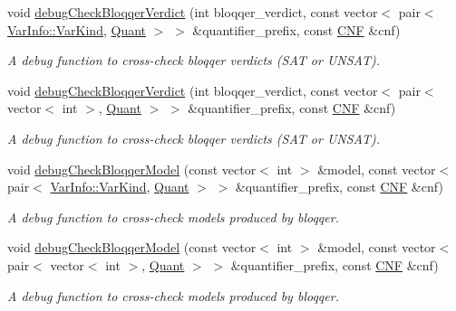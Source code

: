 \begin{DoxyCompactItemize}
void \hyperlink{classDepQBFApi_a3a24cd04a3ddc626f2933429dda4e3b9}{debug\-Check\-Bloqqer\-Verdict} (int bloqqer\-\_\-verdict, const vector$<$ pair$<$ \hyperlink{classVarInfo_a64d1da76cf84fe674e5fef9764ef11cf}{Var\-Info\-::\-Var\-Kind}, \hyperlink{classQBFSolver_ac091e263cb55286cc07b2451bcf4d3c7}{Quant} $>$ $>$ \&quantifier\-\_\-prefix, const \hyperlink{classCNF}{C\-N\-F} \&cnf)
\begin{DoxyCompactList}\small\item\em A debug function to cross-\/check bloqqer verdicts (S\-A\-T or U\-N\-S\-A\-T). \end{DoxyCompactList}\item 
void \hyperlink{classDepQBFApi_afe717cb04d4bd6223bca3e52ba2c7e1f}{debug\-Check\-Bloqqer\-Verdict} (int bloqqer\-\_\-verdict, const vector$<$ pair$<$ vector$<$ int $>$, \hyperlink{classQBFSolver_ac091e263cb55286cc07b2451bcf4d3c7}{Quant} $>$ $>$ \&quantifier\-\_\-prefix, const \hyperlink{classCNF}{C\-N\-F} \&cnf)
\begin{DoxyCompactList}\small\item\em A debug function to cross-\/check bloqqer verdicts (S\-A\-T or U\-N\-S\-A\-T). \end{DoxyCompactList}\item 
void \hyperlink{classDepQBFApi_a55a75bae106e42f6df73fb129a18b4bb}{debug\-Check\-Bloqqer\-Model} (const vector$<$ int $>$ \&model, const vector$<$ pair$<$ \hyperlink{classVarInfo_a64d1da76cf84fe674e5fef9764ef11cf}{Var\-Info\-::\-Var\-Kind}, \hyperlink{classQBFSolver_ac091e263cb55286cc07b2451bcf4d3c7}{Quant} $>$ $>$ \&quantifier\-\_\-prefix, const \hyperlink{classCNF}{C\-N\-F} \&cnf)
\begin{DoxyCompactList}\small\item\em A debug function to cross-\/check models produced by bloqqer. \end{DoxyCompactList}\item 
void \hyperlink{classDepQBFApi_ab8f1fa3fa93a7c6877b22579305f22f5}{debug\-Check\-Bloqqer\-Model} (const vector$<$ int $>$ \&model, const vector$<$ pair$<$ vector$<$ int $>$, \hyperlink{classQBFSolver_ac091e263cb55286cc07b2451bcf4d3c7}{Quant} $>$ $>$ \&quantifier\-\_\-prefix, const \hyperlink{classCNF}{C\-N\-F} \&cnf)
\begin{DoxyCompactList}\small\item\em A debug function to cross-\/check models produced by bloqqer. \end{DoxyCompactList}\end{DoxyCompactItemize}
